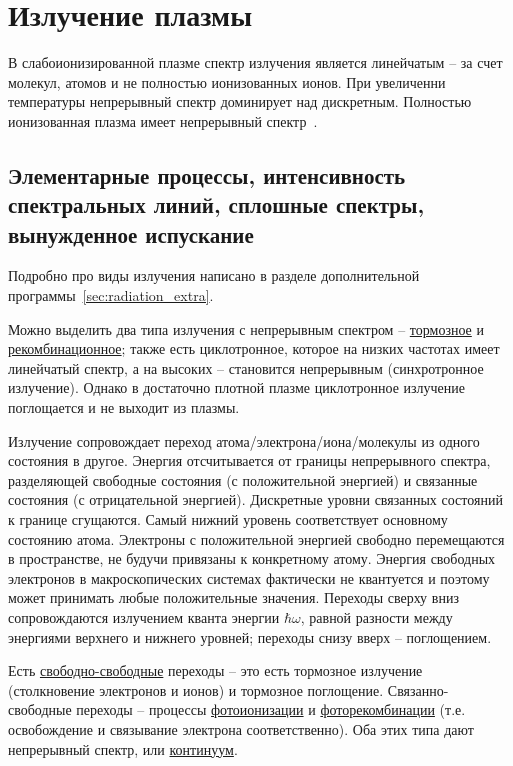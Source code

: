 \documentclass[10pt, a4paper]{article}
\let\stdsection\section
\renewcommand\section{\newpage\stdsection}
\begin{document}
\section{Излучение плазмы} \label{sec:plasma_radiation}

В слабоионизированной плазме спектр излучения является линейчатым -- за счет молекул, атомов и не полностью ионизованных
ионов. При увеличенни температуры непрерывный спектр доминирует над дискретным. Полностью ионизованная плазма имеет
непрерывный спектр~\cite{kotelnikov}.

\subsection{Элементарные процессы, интенсивность спектральных линий, сплошные спектры, вынужденное испускание}

Подробно про виды излучения написано в разделе дополнительной программы~\ref{sec:radiation_extra}.

Можно выделить два типа излучения с непрерывным спектром -- \uline{тормозное} и \uline{рекомбинационное}; также есть циклотронное, которое на низких частотах имеет линейчатый спектр, а на высоких -- становится непрерывным (синхротронное излучение). Однако в достаточно плотной плазме циклотронное излучение поглощается и не выходит из плазмы.

Излучение сопровождает переход атома/электрона/иона/молекулы из одного состояния в другое. Энергия отсчитывается от границы непрерывного спектра, разделяющей свободные состояния (с положительной энергией) и связанные состояния (с отрицательной энергией). Дискретные уровни связанных состояний к границе сгущаются. Самый нижний уровень соответствует основному состоянию атома. Электроны с положительной энергией свободно перемещаются в пространстве, не будучи привязаны к конкретному атому. Энергия свободных электронов в макроскопических системах фактически
не квантуется и поэтому может принимать любые положительные
значения. Переходы сверху вниз сопровождаются излучением кванта энергии
$\hbar\omega$, равной разности между энергиями верхнего и нижнего уровней;
переходы снизу вверх -- поглощением.

Есть \uline{свободно-свободные} переходы -- это есть тормозное излучение (столкновение электронов и ионов) и тормозное поглощение. Связанно-свободные переходы -- процессы \uline{фотоионизации} и \uline{фоторекомбинации} (т.е. освобождение и связывание электрона соответственно). Оба этих типа дают непрерывный спектр, или \uline{континуум}.
\end{document}

